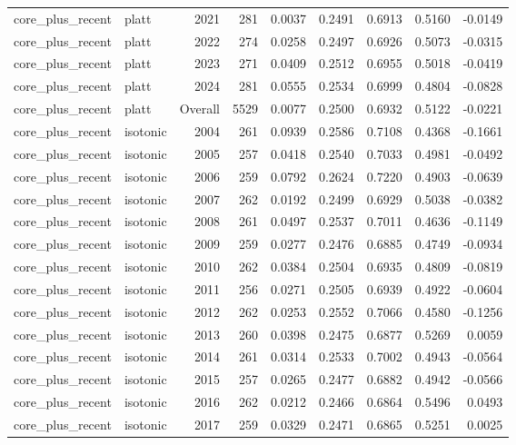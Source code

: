 \begin{table}[t]
\begin{tabular}{@{} l l r r r r r r r @{} }
      core\_plus\_recent & platt & 2021 & 281 & 0.0037 & 0.2491 & 0.6913 & 0.5160 & -0.0149 \\
      core\_plus\_recent & platt & 2022 & 274 & 0.0258 & 0.2497 & 0.6926 & 0.5073 & -0.0315 \\
      core\_plus\_recent & platt & 2023 & 271 & 0.0409 & 0.2512 & 0.6955 & 0.5018 & -0.0419 \\
      core\_plus\_recent & platt & 2024 & 281 & 0.0555 & 0.2534 & 0.6999 & 0.4804 & -0.0828 \\
      core\_plus\_recent & platt & Overall & 5529 & 0.0077 & 0.2500 & 0.6932 & 0.5122 & -0.0221 \\
      core\_plus\_recent & isotonic & 2004 & 261 & 0.0939 & 0.2586 & 0.7108 & 0.4368 & -0.1661 \\
      core\_plus\_recent & isotonic & 2005 & 257 & 0.0418 & 0.2540 & 0.7033 & 0.4981 & -0.0492 \\
      core\_plus\_recent & isotonic & 2006 & 259 & 0.0792 & 0.2624 & 0.7220 & 0.4903 & -0.0639 \\
      core\_plus\_recent & isotonic & 2007 & 262 & 0.0192 & 0.2499 & 0.6929 & 0.5038 & -0.0382 \\
      core\_plus\_recent & isotonic & 2008 & 261 & 0.0497 & 0.2537 & 0.7011 & 0.4636 & -0.1149 \\
      core\_plus\_recent & isotonic & 2009 & 259 & 0.0277 & 0.2476 & 0.6885 & 0.4749 & -0.0934 \\
      core\_plus\_recent & isotonic & 2010 & 262 & 0.0384 & 0.2504 & 0.6935 & 0.4809 & -0.0819 \\
      core\_plus\_recent & isotonic & 2011 & 256 & 0.0271 & 0.2505 & 0.6939 & 0.4922 & -0.0604 \\
      core\_plus\_recent & isotonic & 2012 & 262 & 0.0253 & 0.2552 & 0.7066 & 0.4580 & -0.1256 \\
      core\_plus\_recent & isotonic & 2013 & 260 & 0.0398 & 0.2475 & 0.6877 & 0.5269 & 0.0059 \\
      core\_plus\_recent & isotonic & 2014 & 261 & 0.0314 & 0.2533 & 0.7002 & 0.4943 & -0.0564 \\
      core\_plus\_recent & isotonic & 2015 & 257 & 0.0265 & 0.2477 & 0.6882 & 0.4942 & -0.0566 \\
      core\_plus\_recent & isotonic & 2016 & 262 & 0.0212 & 0.2466 & 0.6864 & 0.5496 & 0.0493 \\
      core\_plus\_recent & isotonic & 2017 & 259 & 0.0329 & 0.2471 & 0.6865 & 0.5251 & 0.0025 \\

\end{tabular}
\end{table}
